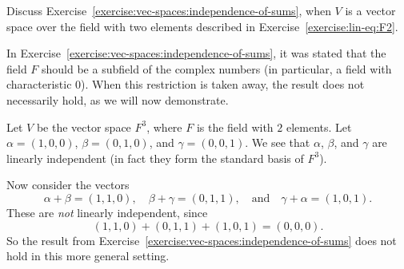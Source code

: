  Discuss
Exercise~\ref{exercise:vec-spaces:independence-of-sums}, when $V$ is a
vector space over the field with two elements described in
Exercise~\ref{exercise:lin-eq:F2}.
\begin{solution}
  In Exercise~\ref{exercise:vec-spaces:independence-of-sums}, it was
  stated that the field $F$ should be a subfield of the complex
  numbers (in particular, a field with characteristic $0$). When this
  restriction is taken away, the result does not necessarily hold, as
  we will now demonstrate.

  Let $V$ be the vector space $F^3$, where $F$ is the field with $2$
  elements. Let $\alpha = (1, 0, 0)$, $\beta = (0, 1, 0)$, and
  $\gamma = (0, 0, 1)$. We see that $\alpha$, $\beta$, and $\gamma$
  are linearly independent (in fact they form the standard basis of
  $F^3$).

  Now consider the vectors
  \begin{equation*}
    \alpha + \beta = (1, 1, 0), \quad
    \beta + \gamma = (0, 1, 1), \quad\text{and}\quad
    \gamma + \alpha = (1, 0, 1).
  \end{equation*}
  These are {\em not} linearly independent, since
  \begin{equation*}
    (1, 1, 0) + (0, 1, 1) + (1, 0, 1) = (0, 0, 0).
  \end{equation*}
  So the result from
  Exercise~\ref{exercise:vec-spaces:independence-of-sums} does not
  hold in this more general setting.
\end{solution}
